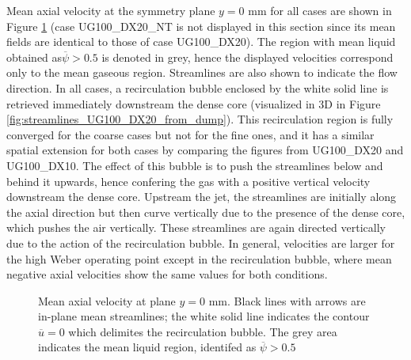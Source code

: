 Mean axial velocity at the symmetry plane $y = 0$ mm for all cases are shown in Figure \ref{fig:JICF_turbulent_structures_plane_y0} (case UG100\_DX20\_NT  is not displayed in this section since its mean fields are identical to those of case UG100\_DX20). The region with mean liquid obtained as$\overline{\psi} > 0.5$ is denoted in grey, hence the displayed velocities correspond only to the mean gaseous region. Streamlines are also shown to indicate the flow direction. In all cases, a recirculation bubble enclosed by the white solid line is retrieved immediately downstream the dense core (visualized in 3D in Figure \ref{fig:streamlines_UG100_DX20_from_dump}). This recirculation region is fully converged for the coarse cases but not for the fine ones, and it has a similar spatial extension for both cases by comparing the figures from UG100\_DX20 and UG100\_DX10. The effect of this bubble is to push the streamlines below and behind it upwards, hence confering the gas with a positive vertical velocity downstream the dense core. Upstream the jet, the streamlines are initially along the axial direction but then curve vertically due to the presence of the dense core, which pushes the air vertically. These streamlines are again directed vertically due to the action of the recirculation bubble. In general, velocities are larger for the high Weber operating point except in the recirculation bubble, where mean negative axial velocities show the same values for both conditions.

\begin{figure}[ht]
\centering

\caption[Mean axial velocity at plane $y = 0$ mm]{Mean axial velocity at plane $y = 0$ mm. Black lines with arrows are in-plane mean streamlines; the white solid line indicates the contour $\overline{u} = 0$ which delimites the recirculation bubble. The grey area  indicates the mean liquid region, identifed as $\overline{\psi} > 0.5$}
\label{fig:JICF_turbulent_structures_plane_y0}
\end{figure}


